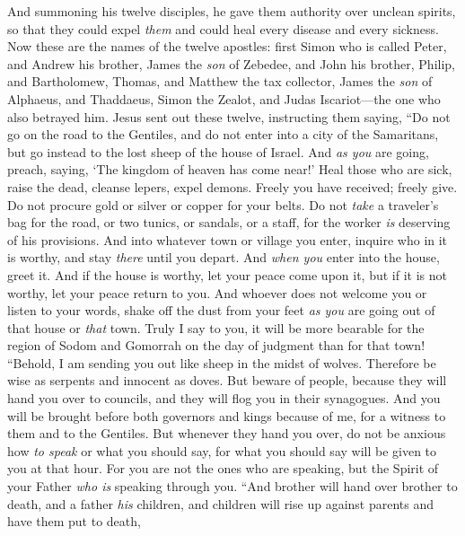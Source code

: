 \begin{biblechapter} %
 And summoning his twelve disciples, he gave them authority over unclean spirits, so that they could expel \textit{them} and could heal every disease and every sickness.
\verse Now these are the names of the twelve apostles: first Simon who is called Peter, and Andrew his brother, James the \textit{son} of Zebedee, and John his brother,
\verse Philip, and Bartholomew, Thomas, and Matthew the tax collector, James the \textit{son} of Alphaeus, and Thaddaeus,
\verse Simon the Zealot, and Judas Iscariot—the one who also betrayed him.
\verse Jesus sent out these twelve, instructing them saying, “Do not go on the road to the Gentiles, and do not enter into a city of the Samaritans,
\verse but go instead to the lost sheep of the house of Israel.
\verse And \textit{as you} are going, preach, saying, ‘The kingdom of heaven has come near!’
\verse Heal those who are sick, raise the dead, cleanse lepers, expel demons. Freely you have received; freely give.
\verse Do not procure gold or silver or copper for your belts.
\verse Do not \textit{take} a traveler’s bag for the road, or two tunics, or sandals, or a staff, for the worker \textit{is} deserving of his provisions.
\verse And into whatever town or village you enter, inquire who in it is worthy, and stay \textit{there} until you depart.
\verse And \textit{when you} enter into the house, greet it.
\verse And if the house is worthy, let your peace come upon it, but if it is not worthy, let your peace return to you.
\verse And whoever does not welcome you or listen to your words, shake off the dust from your feet \textit{as you} are going out of that house or \textit{that} town.
\verse Truly I say to you, it will be more bearable for the region of Sodom and Gomorrah on the day of judgment than for that town!
 “Behold, I am sending you out like sheep in the midst of wolves. Therefore be wise as serpents and innocent as doves.
\verse But beware of people, because they will hand you over to councils, and they will flog you in their synagogues.
\verse And you will be brought before both governors and kings because of me, for a witness to them and to the Gentiles.
\verse But whenever they hand you over, do not be anxious how \textit{to speak} or what you should say, for what you should say will be given to you at that hour.
\verse For you are not the ones who are speaking, but the Spirit of your Father \textit{who is} speaking through you.
\verse “And brother will hand over brother to death, and a father \textit{his} children, and children will rise up against parents and have them put to death,

\end{biblechapter}
